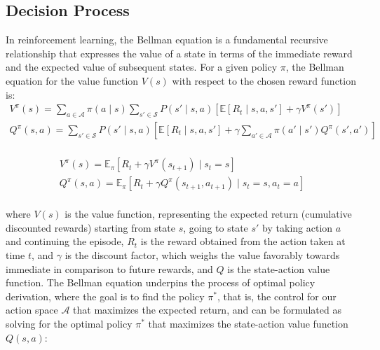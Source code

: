 \subsection{Decision Process}
\label{subsec:decision-process}

In reinforcement learning, the Bellman equation is a fundamental recursive relationship that expresses the value of a
state in terms of the immediate reward and the expected value of subsequent states.
For a given policy $\pi$, the Bellman equation for the value function $V(s)$ with respect to the chosen reward function is:
\begin{equation*}
    \begin{aligned}
        V^\pi(s) = \sum_{a \in \mathcal{A}} \pi(a \mid s) \sum_{s' \in \mathcal{S}} P(s' \mid s, a) \left[ \mathbb{E}[R_t \mid s, a, s'] + \gamma V^\pi(s') \right]\\
        Q^{\pi}(s, a) = \sum_{s' \in \mathcal{S}} P(s' \mid s, a) \left[ \mathbb{E}[R_t \mid s, a, s'] + \gamma \sum_{a' \in \mathcal{A}} \pi(a' \mid s') Q^{\pi}(s', a') \right]\\
    \end{aligned}
\end{equation*}

\begin{equation*}
    \begin{aligned}
        V^\pi(s) = \mathbb{E}_\pi \left[ R_t + \gamma V^\pi(s_{t+1}) \mid s_t = s \right]\\
        Q^{\pi}(s, a) = \mathbb{E}_\pi \left[ R_t + \gamma Q^{\pi}(s_{t+1}, a_{t+1}) \mid s_t = s, a_t = a \right]\\
    \end{aligned}
\end{equation*}

where $V(s)$ is the value function, representing the expected return (cumulative discounted rewards) starting from state $s$,
going to state $s'$ by taking action $a$ and continuing the episode, $R_t$ is the reward obtained from the action taken at time $t$,
and $\gamma$ is the discount factor, which weighs the value favorably towards immediate in comparison to future rewards, and $Q$ is the state-action value function.
The Bellman equation underpins the process of optimal policy derivation, where the goal is to find the policy $\pi^*$,
that is, the control for our action space $\mathcal{A}$ that maximizes the expected return,
and can be formulated as solving for the optimal policy $\pi^*$ that maximizes the state-action value function $Q(s, a)$:

